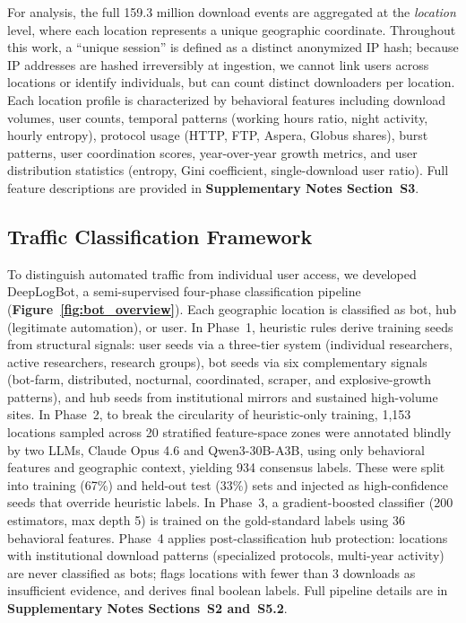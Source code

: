 \documentclass[11pt,a4paper]{article}
\begin{document}
For analysis, the full 159.3 million download events are aggregated at the \textit{location} level, where each location represents a unique geographic coordinate. Throughout this work, a ``unique session'' is defined as a distinct anonymized IP hash; because IP addresses are hashed irreversibly at ingestion, we cannot link users across locations or identify individuals, but can count distinct downloaders per location. Each location profile is characterized by behavioral features including download volumes, user counts, temporal patterns (working hours ratio, night activity, hourly entropy), protocol usage (HTTP, FTP, Aspera, Globus shares), burst patterns, user coordination scores, year-over-year growth metrics, and user distribution statistics (entropy, Gini coefficient, single-download user ratio). Full feature descriptions are provided in \textbf{Supplementary Notes Section~S3}.

\subsection{Traffic Classification Framework}

To distinguish automated traffic from individual user access, we developed DeepLogBot, a semi-supervised four-phase classification pipeline (\textbf{Figure~\ref{fig:bot_overview}}). Each geographic location is classified as bot, hub (legitimate automation), or user. In Phase~1, heuristic rules derive training seeds from structural signals: user seeds via a three-tier system (individual researchers, active researchers, research groups), bot seeds via six complementary signals (bot-farm, distributed, nocturnal, coordinated, scraper, and explosive-growth patterns), and hub seeds from institutional mirrors and sustained high-volume sites. In Phase~2, to break the circularity of heuristic-only training, 1,153 locations sampled across 20 stratified feature-space zones were annotated blindly by two LLMs, Claude Opus 4.6 and Qwen3-30B-A3B, using only behavioral features and geographic context, yielding 934 consensus labels. These were split into training (67\%) and held-out test (33\%) sets and injected as high-confidence seeds that override heuristic labels. In Phase~3, a gradient-boosted classifier (200 estimators, max depth 5) is trained on the gold-standard labels using 36 behavioral features. Phase~4 applies post-classification hub protection: locations with institutional download patterns (specialized protocols, multi-year activity) are never classified as bots; flags locations with fewer than 3 downloads as insufficient evidence, and derives final boolean labels. Full pipeline details are in \textbf{Supplementary Notes Sections~S2 and~S5.2}.
\end{document}
